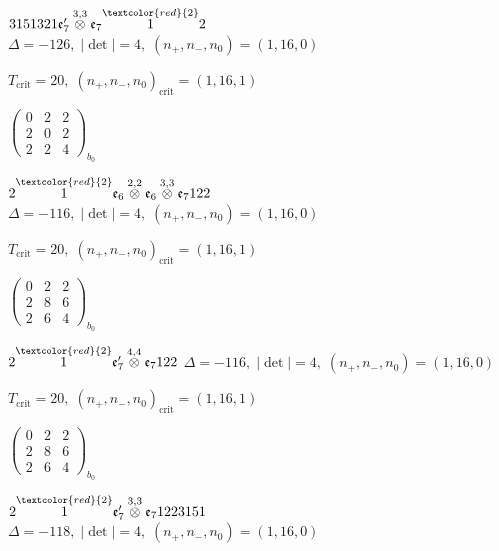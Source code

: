 \documentclass[10pt]{article}
\begin{document}
$3151321\mathfrak{e}_7'\overset{3,3}{\otimes}\mathfrak{e}_7\overset{\textcolor{red}{2}}{1}2$ \quad $\Delta=-126,\; |\det|=4,\; (n_+,n_-,n_0)=(1,16,0)$

\hspace{1em}$T_{\text{crit}}=20,\; (n_+,n_-,n_0)_{\text{crit}}=(1,16,1)$

\hspace{2em}$\left(\begin{smallmatrix}0 & 2 & 2 \\ 2 & 0 & 2 \\ 2 & 2 & 4\end{smallmatrix}\right)_{\!b_0}$

\smallskip

$2\overset{\textcolor{red}{2}}{1}\mathfrak{e}_6\overset{2,2}{\otimes}\mathfrak{e}_6\overset{3,3}{\otimes}\mathfrak{e}_7122$ \quad $\Delta=-116,\; |\det|=4,\; (n_+,n_-,n_0)=(1,16,0)$

\hspace{1em}$T_{\text{crit}}=20,\; (n_+,n_-,n_0)_{\text{crit}}=(1,16,1)$

\hspace{2em}$\left(\begin{smallmatrix}0 & 2 & 2 \\ 2 & 8 & 6 \\ 2 & 6 & 4\end{smallmatrix}\right)_{\!b_0}$

\smallskip

$2\overset{\textcolor{red}{2}}{1}\mathfrak{e}_7'\overset{4,4}{\otimes}\mathfrak{e}_7122$ \quad $\Delta=-116,\; |\det|=4,\; (n_+,n_-,n_0)=(1,16,0)$

\hspace{1em}$T_{\text{crit}}=20,\; (n_+,n_-,n_0)_{\text{crit}}=(1,16,1)$

\hspace{2em}$\left(\begin{smallmatrix}0 & 2 & 2 \\ 2 & 8 & 6 \\ 2 & 6 & 4\end{smallmatrix}\right)_{\!b_0}$

\smallskip

$2\overset{\textcolor{red}{2}}{1}\mathfrak{e}_7'\overset{3,3}{\otimes}\mathfrak{e}_71223151$ \quad $\Delta=-118,\; |\det|=4,\; (n_+,n_-,n_0)=(1,16,0)$
\end{document}
